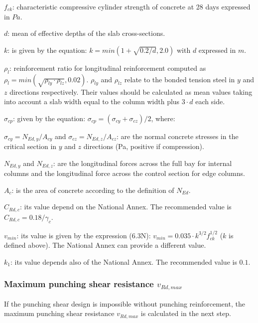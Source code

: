 \begin{description}
\item{$f_{ck}$:} characteristic compressive cylinder strength of concrete at 28 days expressed in $Pa$.
\item{$d$:} mean of effective depths of the slab cross-sections.
\item{$k$:} is given by the equation: $k= min(1+\sqrt{0.2/d}, 2.0)$ with $d$ expressed in $m$.
\item{$\rho_l$:} reinforcement ratio for longitudinal reinforcement computed as $\rho_l= min(\sqrt{\rho_{ly} \cdot \rho_{lz}}, 0.02)$. $\rho_{ly}$ and $\rho_{lz}$ relate to the bonded tension steel in $y$ and $z$ directions respectively. Their values should be calculated as mean values taking into account a slab width equal to the column width plus $3 \cdot d$ each side.
\item{$\sigma_{cp}$:} given by the equation: $\sigma_{cp}= (\sigma_{cy}+\sigma_{cz})/2$, where:
  \begin{description}
  \item{$\sigma_{cy}= N_{Ed,y}/A_{cy}$ and $\sigma_{cz}= N_{Ed,z}/A_{cz}$:} are the normal concrete stresses in the critical section in $y$ and $z$ directions (Pa, positive if compression).
  \item{$N_{Ed,y}$ and $N_{Ed,z}$:} are the longitudinal forces across the full bay for internal columns and the longitudinal force across the control section for edge columns.
  \item{$A_c$:} is the area of concrete according to the definition of $N_{Ed}$.
  \end{description}
\item{$C_{Rd,c}$:} its value depend on the National Annex. The recommended value is $C_{Rd,c}= 0.18/\gamma_c$.
\item{$v_{min}$:} its value is given by the expression (6.3N): $v_{min}= 0.035 \cdot k^{3/2} f_{ck}^{1/2}$ ($k$ is defined above). The National Annex can provide a different value.
\item{$k_1$:} its value depends also of the National Annex. The recommended value is $0.1$.
\end{description}

\subsubsection{Maximum punching shear resistance $v_{Rd, max}$}
If the punching shear design is impossible without punching reinforcement, the maximum punching shear resistance $v_{Rd, max}$ is calculated in the next step.

